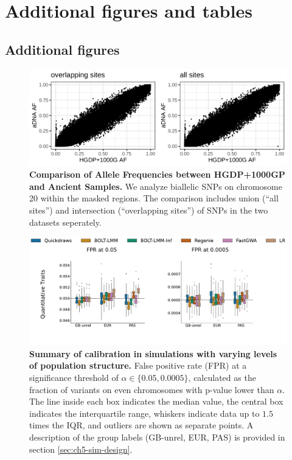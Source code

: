 \chapter{\label{app:1-KL_divergence}Additional figures and tables}

\minitoc

\section{Additional figures}
\label{sec:additional_figures}

\begin{figure}
    \centering
    \includegraphics[width=\textwidth]{figures/gb_merge_sanity_check.png}
    \caption{\textbf{Comparison of Allele Frequencies between HGDP+1000GP and Ancient Samples.} We analyze biallelic SNPs on chromosome 20 within the masked regions. The comparison includes union (``all sites'') and intersection (``overlapping sites'') of SNPs in the two datasets seperately.}
    \label{fig:gb-sanity-check}
\end{figure}

\begin{figure}[h!]
    \centering
    \includegraphics[width=\textwidth]{figures/sim_calibration/popstructure_fpr.pdf}
    \caption{
    \textbf{Summary of calibration in simulations with varying levels of population structure.}
    False positive rate (FPR) at a significance threshold of $\alpha \in \{0.05, 0.0005\}$, calculated as the fraction of variants on even chromosomes with p-value lower than $\alpha$.
    The line inside each box indicates the median value, the central box indicates the interquartile range, whiskers indicate data up to $1.5$ times the IQR, and outliers are shown as separate points.
    A description of the group labels (GB-unrel, EUR, PAS) is provided in section \ref{sec:ch5-sim-design}.
    }
    \label{fig:sim_calib_pop}
\end{figure}

